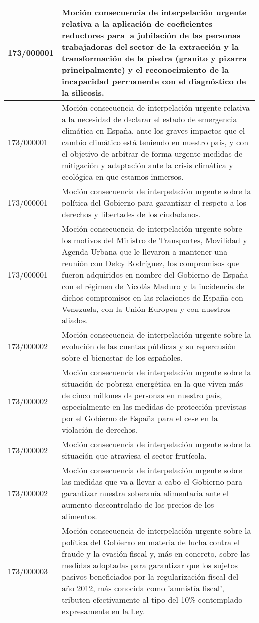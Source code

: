 {\begin{table}[H]
\begin{center}
\begin{tabularx}{\linewidth}{| l | X |}
\hline
173/000001 & Moción consecuencia de interpelación urgente relativa a la aplicación de coeficientes reductores para la jubilación de las personas trabajadoras del sector de la extracción y la transformación de la piedra (granito y pizarra principalmente) y el reconocimiento de la incapacidad permanente con el diagnóstico de la silicosis. \\
\hline
173/000001 & Moción consecuencia de interpelación urgente relativa a la necesidad de declarar el estado de emergencia climática en España, ante los graves impactos que el cambio climático está teniendo en nuestro país, y con el objetivo de arbitrar de forma urgente medidas de mitigación y adaptación ante la crisis climática y ecológica en que estamos inmersos. \\
\hline
173/000001 & Moción consecuencia de interpelación urgente sobre la política del Gobierno para garantizar el respeto a los derechos y libertades de los ciudadanos. \\
\hline
173/000001 & Moción consecuencia de interpelación urgente sobre los motivos del Ministro de Transportes, Movilidad y Agenda Urbana que le llevaron a mantener una reunión con Delcy Rodríguez, los compromisos que fueron adquiridos en nombre del Gobierno de España con el régimen de Nicolás Maduro y la incidencia de dichos compromisos en las relaciones de España con Venezuela, con la Unión Europea y con nuestros aliados. \\
\hline
173/000002 & Moción consecuencia de interpelación urgente sobre la evolución de las cuentas públicas y su repercusión sobre el bienestar de los españoles. \\
\hline
173/000002 & Moción consecuencia de interpelación urgente sobre la situación de pobreza energética en la que viven más de cinco millones de personas en nuestro país, especialmente en las medidas de protección previstas por el Gobierno de España para el cese en la violación de derechos. \\
\hline
173/000002 & Moción consecuencia de interpelación urgente sobre la situación que atraviesa el sector frutícola. \\
\hline
173/000002 & Moción consecuencia de interpelación urgente sobre las medidas que va a llevar a cabo el Gobierno para garantizar nuestra soberanía alimentaria ante el aumento descontrolado de los precios de los alimentos. \\
\hline
173/000003 & Moción consecuencia de interpelación urgente sobre la política del Gobierno en materia de lucha contra el fraude y la evasión fiscal y, más en concreto, sobre las medidas adoptadas para garantizar que los sujetos pasivos beneficiados por la regularización fiscal del año 2012, más conocida como 'amnistía fiscal', tributen efectivamente al tipo del 10\% contemplado expresamente en la Ley. \\

\end{tabularx}
\end{center}
\end{table}}
